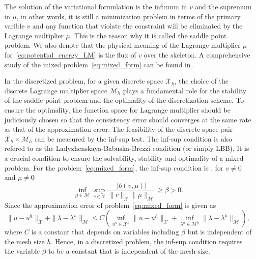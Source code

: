 \documentclass[preprint,12pt]{elsarticle}
\begin{document}
The solution of the variational formulation is the infimum in $v$ and the supremum in $\mu$, in other words, it is still a minimization problem in terms of the primary varible $v$ and any function that violate the constraint will be eliminated by the Lagrange multiplier $\mu$. This is the reason why it is called the saddle point problem. We also denote that the physical meaning of the Lagrange multiplier $\mu$ for~\eqref{eq:potential_energy_LM} is the flux of $v$ over the skeleton. A comprehensive study of the mixed problem~\eqref{eq:mixed_form} can be found in \cite{boffi_mixed_2013}.\par

In the discretized problem, for a given discrete space $\mathcal{X}_h$, the choice of the discrete Lagrange multiplier space $\mathcal{M}_h$ plays a fundamental role for the stability of the saddle point problem and the optimality of the discretization scheme. To ensure the optimality, the function space for Lagrange multiplier should be judiciously chosen so that the consistency error should converges at the same rate as that of the approximation error. The feasibility of the discrete space pair $\mathcal{X}_h\times{}\mathcal{M}_h$ can be measured by the inf-sup test. The inf-sup condition is also refered to as the Ladyzhenskaya-Babuska-Brezzi condition (or simply LBB). It is a crucial condition to ensure the solvability, stability and optimality of a mixed problem. For the problem~\eqref{eq:mixed_form}, the inf-sup condition is \cite{boffi_mixed_2013}, for $v\neq{0}$ and $\mu\neq{0}$
\begin{equation}
    \inf_{\mu\in{\mathcal{M}}}\sup_{v\in{\mathcal{X}}}\dfrac{\vert{b\left({v,\mu}\right)}\vert}{\|{v}\|_{\mathcal{X}}\|{\mu}\|_{\mathcal{M}}}\geq\beta>0.
\end{equation}
Since the approximation error of problem~\eqref{eq:mixed_form} is given as
\begin{equation}
    \|u-u^h\|_{\mathcal{X}}+\|\lambda-\lambda^h\|_{\mathcal{M}}\leq{}C\left({\inf_{u^h\in\mathcal{X}^h}\|u-u^h\|_{\mathcal{X}}+\inf_{\lambda^h\in\mathcal{M}^h}\|\lambda-\lambda^h\|_{\mathcal{M}}}\right),
\end{equation}
where $C$ is a constant that depends on variables including $\beta$ but is independent of the mesh size $h$. Hence, in a discretized problem, the inf-sup condition requires the variable $\beta$ to be a constant that is independent of the mesh size. \par 
\end{document}
